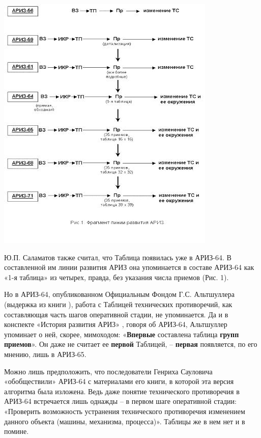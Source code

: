 \documentclass[11pt,a4paper]{article}
\begin{document}
\begin{center}
  \includegraphics[width=.7\textwidth]{./8.jpg}
\end{center}

Ю.П. Саламатов \cite{Salamatov1992} также считал, что Таблица появилась уже в
АРИЗ-64. В составленной им линии развития АРИЗ она упоминается в составе
АРИЗ-64 как «1-я таблица» из четырех, правда, без указания числа приемов
(Рис. 1).

Но в АРИЗ-64, опубликованном Официальным Фондом Г.С. Альтшуллера (выдержка из
книги \cite{Altshuller1964}), работа с Таблицей технических противоречий, как
составляющая часть шагов оперативной стадии, не упоминается.  Да и в конспекте
«История развития АРИЗ» \cite{Altshuller1986a}, говоря об АРИЗ-64, Альтшуллер
упоминает о ней, скорее, мимоходом: «\textbf{Впервые} составлена таблица
\textbf{групп приемов}».  Он даже не считает ее \textbf{первой} Таблицей, --
\textbf{первая} появляется, по его мнению, лишь в АРИЗ-65.

Можно лишь предположить, что последователи Генриха Сауловича «обобществили»
АРИЗ-64 с материалами его книги, в которой эта версия алгоритма была изложена.
Ведь даже понятие технического противоречия в АРИЗ-64 встречается лишь однажды
-- в первом шаге оперативной стадии: «Проверить возможность устранения
технического противоречия изменением данного объекта (машины, механизма,
процесса)».  Таблицы же в нем нет и в помине.
\end{document}

